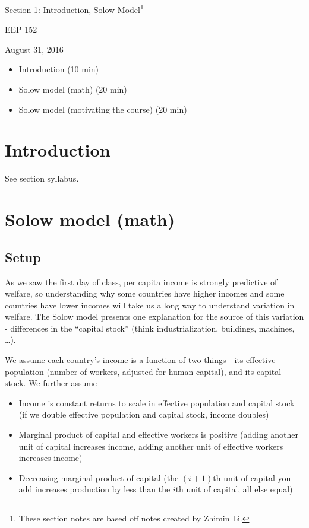 \documentclass[12pt,english]{article}
\begin{document}
\begin{center}
{\Large{}Section 1: Introduction, Solow Model\footnote{These section notes are based off notes created by Zhimin Li.}}
\par\end{center}{\Large \par}

\begin{center}
EEP 152
\par\end{center}

\begin{center}
August 31, 2016
\par\end{center}

\begin{itemize}
	\setlength\itemsep{-0.5em}
	\item Introduction (10 min)
	\item Solow model (math) (20 min)
	\item Solow model (motivating the course) (20 min)
\end{itemize}

\section{Introduction}

See section syllabus.

\section{Solow model (math)}

\subsection{Setup}

As we saw the first day of class, per capita income is strongly predictive of welfare, so understanding why some countries have higher incomes and some countries have lower incomes will take us a long way to understand variation in welfare. The Solow model presents one explanation for the source of this variation - differences in the ``capital stock'' (think industrialization, buildings, machines, \ldots).

We assume each country's income is a function of two things - its effective population (number of workers, adjusted for human capital), and its capital stock. We further assume
\begin{itemize}
	\item Income is constant returns to scale in effective population and capital stock (if we double effective population and capital stock, income doubles)
	\item Marginal product of capital and effective workers is positive (adding another unit of capital increases income, adding another unit of effective workers increases income)
	\item Decreasing marginal product of capital (the $(i+1)$th unit of capital you add increases production by less than the $i$th unit of capital, all else equal)
\end{itemize}
\end{document}
